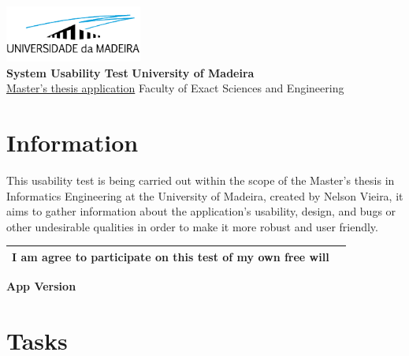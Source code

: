 \documentclass[12pt,a4paper]{article}
\date{}
\begin{document}
\noindent
\hfill \includegraphics[width=4.5cm]{assets/images/uma_logo.png} \\
\large
\textbf{System Usability Test} \hfill \textbf{University of Madeira} \\
\normalsize
\hyperlink{https://github.com/nelson-vieira/masters-thesis/tree/master/masters-thesis/app}{Master's thesis application} \hfill Faculty of Exact Sciences and Engineering \\

\section*{Information}

This usability test is being carried out within the scope of the Master's thesis
in Informatics Engineering at the University of Madeira, created by Nelson Vieira,
it aims to gather information about the application's usability, design, and bugs
or other undesirable qualities in order to make it more robust and user friendly.

\vspace{1cm}

\begin{tabular}{|m{10cm}|m{1cm}|}
    \hline
    I am agree to participate on this test of my own free will & \\
    \hline
\end{tabular}

\vspace{1cm}

\textbf{App Version}

\clearpage

\section*{Tasks}
\end{document}
